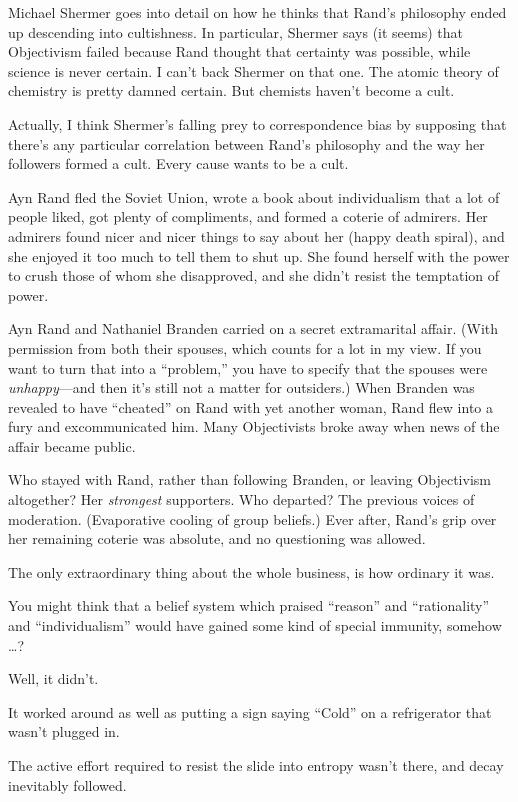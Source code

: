 {
 Michael Shermer goes into detail on how he thinks that
Rand's philosophy ended up descending into cultishness.
In particular, Shermer says (it seems) that Objectivism failed because
Rand thought that certainty was possible, while science is never
certain. I can't back Shermer on that one. The atomic
theory of chemistry is pretty damned certain. But chemists
haven't become a cult.}

{
 Actually, I think Shermer's falling prey to
correspondence bias by supposing that there's any
particular correlation between Rand's philosophy and
the way her followers formed a cult. Every cause wants to be a cult.}

{
 Ayn Rand fled the Soviet Union, wrote a book about individualism
that a lot of people liked, got plenty of compliments, and formed a
coterie of admirers. Her admirers found nicer and nicer things to say
about her (happy death spiral), and she enjoyed it too much to tell
them to shut up. She found herself with the power to crush those of
whom she disapproved, and she didn't resist the
temptation of power.}

{
 Ayn Rand and Nathaniel Branden carried on a secret extramarital
affair. (With permission from both their spouses, which counts for a
lot in my view. If you want to turn that into a
``problem,'' you have to specify
that the spouses were \textit{unhappy}{}---and then
it's still not a matter for outsiders.) When Branden
was revealed to have ``cheated'' on
Rand with yet another woman, Rand flew into a fury and excommunicated
him. Many Objectivists broke away when news of the affair became
public.}

{
 Who stayed with Rand, rather than following Branden, or leaving
Objectivism altogether? Her \textit{strongest} supporters. Who
departed? The previous voices of moderation. (Evaporative cooling of
group beliefs.) Ever after, Rand's grip over her
remaining coterie was absolute, and no questioning was allowed.}

{
 The only extraordinary thing about the whole business, is how
ordinary it was.}

{
 You might think that a belief system which praised
``reason'' and
``rationality'' and
``individualism'' would have gained
some kind of special immunity, somehow \ldots ?}

{
 Well, it didn't.}

{
 It worked around as well as putting a sign saying
``Cold'' on a refrigerator that
wasn't plugged in.}

{
 The active effort required to resist the slide into entropy
wasn't there, and decay inevitably followed.}

